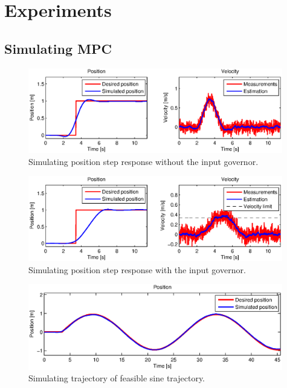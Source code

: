 \section{Experiments}

\subsection{Simulating MPC}

\begin{figure}[H]
\centering
\includegraphics[width=0.99\textwidth]{fig/simulation1.eps}
\caption{Simulating position step response without the input governor.}
\label{fig:simulation_step_no_governor}
\end{figure}

\begin{figure}[H]
\centering
\includegraphics[width=0.99\textwidth]{fig/simulation2.eps}
\caption{Simulating position step response with the input governor.}
\label{fig:simulation_step_governor}
\end{figure}

\begin{figure}[H]
\centering
\includegraphics[width=0.99\textwidth]{fig/simulation3.eps}
\caption{Simulating trajectory of feasible sine trajectory.}
\label{fig:simulation_step_governor}
\end{figure}

